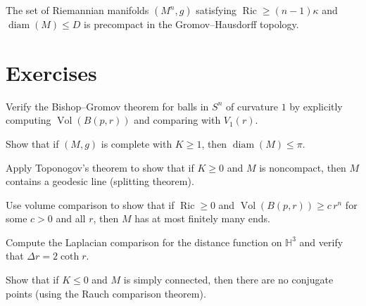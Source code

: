 \begin{theorem}
The set of Riemannian manifolds $(M^n, g)$ satisfying
$\operatorname{Ric} \geq (n-1)\kappa$ and $\operatorname{diam}(M) \leq D$
is precompact in the Gromov--Hausdorff topology.
\end{theorem}

\section{Exercises}

\begin{exercise}
Verify the Bishop--Gromov theorem for balls in $S^n$ of curvature $1$ by
explicitly computing $\operatorname{Vol}(B(p, r))$ and comparing with $V_1(r)$.
\end{exercise}

\begin{exercise}
Show that if $(M, g)$ is complete with $K \geq 1$, then $\operatorname{diam}(M) \leq \pi$.
\end{exercise}

\begin{exercise}
Apply Toponogov's theorem to show that if $K \geq 0$ and $M$ is noncompact,
then $M$ contains a geodesic line (splitting theorem).
\end{exercise}

\begin{exercise}
Use volume comparison to show that if $\operatorname{Ric} \geq 0$ and
$\operatorname{Vol}(B(p,r)) \geq c\, r^n$ for some $c > 0$ and all $r$,
then $M$ has at most finitely many ends.
\end{exercise}

\begin{exercise}
Compute the Laplacian comparison for the distance function on $\mathbb{H}^3$
and verify that $\Delta r = 2\coth r$.
\end{exercise}

\begin{exercise}
Show that if $K \leq 0$ and $M$ is simply connected, then there are no conjugate
points (using the Rauch comparison theorem).
\end{exercise}
